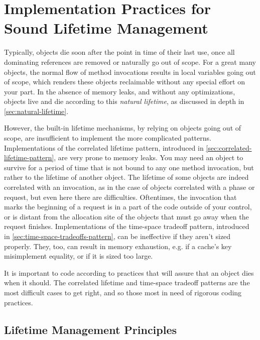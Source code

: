 \chapter{Implementation Practices for Sound Lifetime Management}
\label{chapter:lifetime-implementation-strategies}

Typically, objects die soon after the point in time of their last use, once all
dominating references are removed or naturally go out of scope. For a great many
objects, the normal flow of method invocations results in local variables going
out of scope, which renders these objects reclaimable without any special effort
on your part. In the absence of memory leaks, and without any optimizations,
objects live and die according to this \emph{natural lifetime}, as discussed in
depth in \autoref{sec:natural-lifetime}. 

However, the built-in lifetime mechanisms, by relying on objects going out of
scope, are insufficient to implement the more complicated patterns.
Implementations of the correlated lifetime pattern, introduced in
\autoref{sec:correlated-lifetime-pattern}, are very prone to memory leaks. You
may need an object to survive for a period of time that is not bound to any one
method invocation, but rather to the lifetime of another object. The lifetime of
some objects are indeed correlated with an invocation, as in the case of objects
correlated with a phase or request, but even here there are difficulties.
Oftentimes, the invocation that marks the beginning of a request is in a part of
the code outside of your control, or is distant from the allocation site of the
objects that must go away when the request finishes. Implementations of the
time-space tradeoff pattern, introduced in
\autoref{sec:time-space-tradeoffs-pattern}, can be ineffective if they aren't
sized properly. They, too, can result in memory exhaustion, e.g. if a cache's key
misimplement equality, or if it is sized too large.

It is important to code according to practices that will assure that an object
dies when it should. The correlated lifetime and time-space tradeoff patterns are
the most difficult cases to get right, and so those most in need of rigorous
coding practices.


\section{Lifetime Management Principles}


